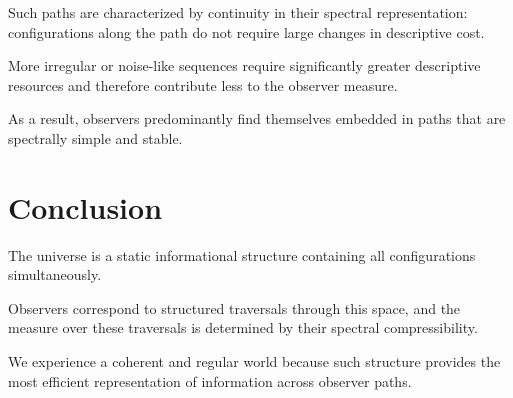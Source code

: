 Such paths are characterized by continuity in their spectral representation: configurations along the path do not require large changes in descriptive cost.

More irregular or noise-like sequences require significantly greater descriptive resources and therefore contribute less to the observer measure.

As a result, observers predominantly find themselves embedded in paths that are spectrally simple and stable.


\section{Conclusion}

The universe is a static informational structure containing all configurations simultaneously.

Observers correspond to structured traversals through this space, and the measure over these traversals is determined by their spectral compressibility.

We experience a coherent and regular world because such structure provides the most efficient representation of information across observer paths.
